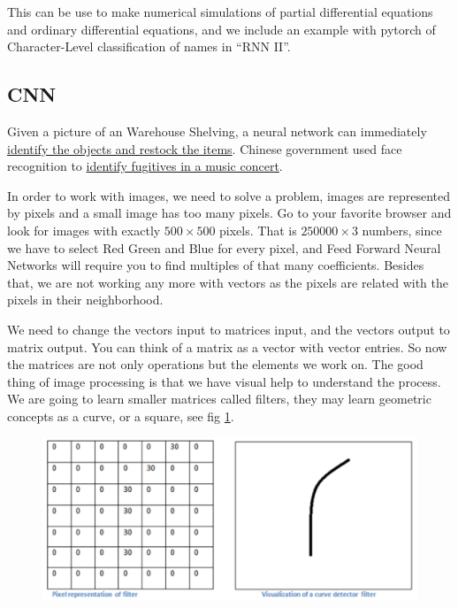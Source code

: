 \documentclass[11pt,letterpaper]{report}
\begin{document}
    This can be use to make numerical simulations of partial differential equations and ordinary differential equations, and we include an example with pytorch of Character-Level classification of names in ``RNN II''.

	\subsection{CNN}
	
	Given a picture of an Warehouse Shelving, a  neural network can immediately 
	\href{https://developers.google.com/machine-learning/crash-course/fairness/video-lecture?utm_source=keyword-blog&utm_medium=blog&utm_campaign=mle-outreach&utm_term=&utm_content=mlcc-fairness}{identify the objects and restock the items}.
	Chinese government used face recognition to \href{http://fortune.com/2018/10/28/in-china-facial-recognition-tech-is-watching-you/}{identify fugitives in a music concert}.
	
	In order to work with images, we need to solve a problem, images are represented by pixels and a small image has too many pixels. Go to your favorite browser and look for images with exactly  $500\times500$ pixels. That is $250000\times3$ numbers, since we have to select Red Green and Blue for every pixel, and Feed Forward Neural Networks will require you to find multiples of that many coefficients. Besides that, we are not working any more with vectors as the pixels are related with the pixels in their neighborhood.
	
	We need to change the vectors input to matrices input,  and the vectors output to matrix output. You can think of a matrix as a vector with vector entries.  So now the matrices are not only operations but the elements we work on.
	The good thing of image processing is that we have visual help to understand the process. We are going to learn smaller matrices called filters, they may learn geometric concepts as a curve, or a square, see fig \ref{fig:filter}.  
	
	\begin{figure}[h!]
		\centering
		\includegraphics[width=0.45\linewidth]{figures/filter.png}
		\caption{}
		\label{fig:filter}
	\end{figure} 	
\end{document}
